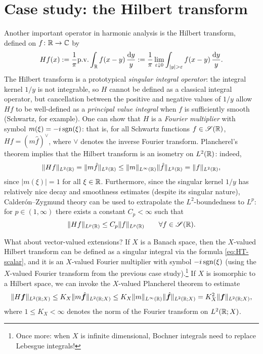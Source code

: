 \section{Case study: the Hilbert transform}

Another important operator in harmonic analysis is the Hilbert transform, defined on $f \colon \mathbb{R} \rightarrow \mathbb{C}$ by
\begin{equation}\label{eq:HT-scalar}
  Hf(x) := \frac{1}{\pi} \mathrm{p. v.} \int_{\mathbb{R}} f(x-y) \, \frac{\mathrm{d} y}{y} := \frac{1}{\pi} \lim_{\varepsilon \downarrow 0} \int_{|y| > \varepsilon} f(x-y) \, \frac{\mathrm{d} y}{y}.
\end{equation}
The Hilbert transform is a prototypical \emph{singular integral operator}: the integral kernel $1/y$ is not integrable, so $H$ cannot be defined as a classical integral operator, but cancellation between the positive and negative values of $1/y$ allow $Hf$ to be well-defined as a \emph{principal value integral} when $f$ is sufficiently smooth (Schwartz, for example).
One can show that $H$ is a \emph{Fourier multiplier} with symbol $m(\xi) = -i\operatorname{sgn}(\xi)$: that is, for all Schwartz functions $f \in \mathscr{S}(\mathbb{R})$, $Hf = (m\hat{f})^{\vee}$, where $\vee$ denotes the inverse Fourier transform.
Plancherel's theorem implies that the Hilbert transform is an isometry on $L^2(\mathbb{R})$: indeed,
\begin{equation*}
  \|Hf\|_{L^2(\mathbb{R})} = \|m\hat{f}\|_{L^2(\mathbb{R})} \leq \|m\|_{L^\infty(\mathbb{R})} \|\hat{f}\|_{L^2(\mathbb{R})} = \|f\|_{L^{2}(\mathbb{R})},
\end{equation*}
since $|m(\xi)| = 1$ for all $\xi \in \mathbb{R}$.
Furthermore, since the singular kernel $1/y$ has relatively nice decay and smoothness estimates (despite its singular nature), Calder\'on--Zygmund theory can be used to extrapolate the $L^2$-boundedness to $L^p$: for $p \in (1,\infty)$ there exists a constant $C_{p} < \infty$ such that
\begin{equation*}
  \|Hf\|_{L^p(\mathbb{R})} \leq C_{p} \|f\|_{L^p(\mathbb{R})} \qquad \forall f \in \mathscr{S}(\mathbb{R}).
\end{equation*}

What about vector-valued extensions?
If $X$ is a Banach space, then the $X$-valued Hilbert transform can be defined as a singular integral via the formula \eqref{eq:HT-scalar}, and it is an $X$-valued Fourier multiplier with symbol $-i\operatorname{sgn}(\xi)$ (using the $X$-valued Fourier transform from the previous case study).\footnote{Once more: when $X$ is infinite dimensional, Bochner integrals need to replace Lebesgue integrals!}
If $X$ is isomorphic to a Hilbert space, we can invoke the $X$-valued Plancherel theorem to estimate
\begin{equation*}
  \|H\bm{f}\|_{L^2(\mathbb{R};X)} \leq K_{X} \|m\hat{\bm{f}}\|_{L^2(\mathbb{R};X)} \leq K_{X} \|m\|_{L^\infty(\mathbb{R})} \|\hat{\bm{f}}\|_{L^2(\mathbb{R};X)}= K_{X}^{2} \|\bm{f}\|_{L^{2}(\mathbb{R};X)},
\end{equation*}
where $1 \leq K_{X} < \infty$ denotes the norm of the Fourier transform on $L^2(\mathbb{R};X)$.

